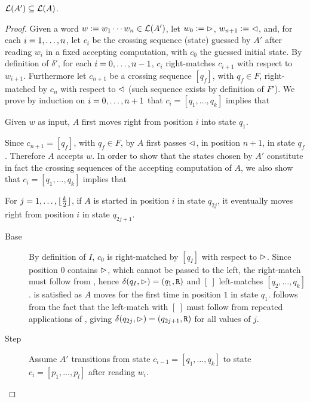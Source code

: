 \begin{lemm}\label{lem:2DFAto1NFA-2}
	$\mathcal L(A')\subseteq\mathcal L(A)$.
\end{lemm}
\begin{proof}
	Given a word $w:=w_1\cdots w_n\in\mathcal L(A')$, let $w_0:=\rhd$, $w_{n+1}:=\lhd$, and, for each $i=1,\dots,n$, let $c_i$ be the crossing sequence (state) guessed by $A'$ after reading $w_i$ in a fixed accepting computation, with $c_0$ the guessed initial state.
	By definition of $\delta'$, for each $i=0,\dots,n-1$, $c_i$ right-matches $c_{i+1}$ with respect to $w_{i+1}$.
	Furthermore let $c_{n+1}$ be a crossing sequence $[q_f]$, with $q_f\in F$, right-matched by $c_n$ with respect to $\lhd$ (such sequence exists by definition of $F'$).
	We prove by induction on $i=0,\dots,n+1$ that $c_i=[q_1,\dots,q_k]$ implies that
	\begin{statements}
		\item \label{lem:2DFAto1NFA-2-1} Given $w$ as input, $A$ first moves right from position $i$ into state $q_1$.
	\end{statements}
	Since $c_{n+1}=[q_f]$, with $q_f\in F$, by  $A$ first passes $\lhd$, in position $n+1$, in state $q_f$. Therefore $A$ accepts $w$.
	In order to show that the states chosen by $A'$ constitute in fact the crossing sequences of the accepting computation of $A$, we also show that $c_i=[q_1,\dots,q_k]$ implies that
	\begin{statements}[resume]
		\item \label{lem:2DFAto1NFA-2-2} For $j=1,\dots,\lfloor \frac{k}{2} \rfloor$, if $A$ is started in position $i$ in state $q_{2j}$, it eventually moves right from position $i$ in state $q_{2j+1}$.
	\end{statements}
	\begin{description}
		\item[Base] By definition of $I$, $c_0$ is right-matched by $[q_I]$ with respect to $\rhd$. Since position $0$ contains $\rhd$, which cannot be passed to the left, the right-match must follow from , hence $\delta(q_I,\rhd)=(q_1,\mathtt R)$ and $[~]$ left-matches $[q_2,\dots,q_k]$.
		       is satisfied as $A$ moves for the first time in position $1$ in state $q_1$.
		       follows from the fact that the left-match with $[~]$ must follow from repeated applications of , giving $\delta(q_{2j},\rhd)=(q_{2j+1},\mathtt R)$ for all values of $j$.
		\item[Step] Assume $A'$ transitions from state $c_{i-1}=[q_1,\dots,q_k]$ to state $c_i=[p_1,\dots,p_l]$ after reading $w_i$.

\end{description}
\end{proof}
